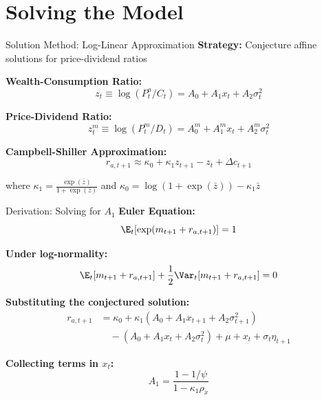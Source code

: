 \documentclass{beamer}
\begin{document}
\section{Solving the Model}

\begin{frame}{Solution Method: Log-Linear Approximation}
    \textbf{Strategy:} Conjecture affine solutions for price-dividend ratios
    
    \textbf{Wealth-Consumption Ratio:}
    \begin{equation}
        z_t \equiv \log(P_t^a / C_t) = A_0 + A_1 x_t + A_2 \sigma_t^2
    \end{equation}
    
    \textbf{Price-Dividend Ratio:}
    \begin{equation}
        z_t^m \equiv \log(P_t^m / D_t) = A_0^m + A_1^m x_t + A_2^m \sigma_t^2
    \end{equation}
    
    \vspace{0.3cm}
    \textbf{Campbell-Shiller Approximation:}
    \begin{equation}
        r_{a,t+1} \approx \kappa_0 + \kappa_1 z_{t+1} - z_t + \Delta c_{t+1}
    \end{equation}
    
    where $\kappa_1 = \frac{\exp(\bar{z})}{1+\exp(\bar{z})}$ and $\kappa_0 = \log(1+\exp(\bar{z})) - \kappa_1 \bar{z}$
\end{frame}

\begin{frame}{Derivation: Solving for $A_1$}
    \textbf{Euler Equation:}
    \begin{equation}
        \E_t[\exp(m_{t+1} + r_{a,t+1})] = 1
    \end{equation}
    
    \textbf{Under log-normality:}
    \begin{equation}
        \E_t[m_{t+1} + r_{a,t+1}] + \frac{1}{2} \Var_t[m_{t+1} + r_{a,t+1}] = 0
    \end{equation}
    
    \textbf{Substituting the conjectured solution:}
    \begin{align}
        r_{a,t+1} &= \kappa_0 + \kappa_1(A_0 + A_1 x_{t+1} + A_2 \sigma_{t+1}^2) \nonumber \\
        &\quad - (A_0 + A_1 x_t + A_2 \sigma_t^2) + \mu + x_t + \sigma_t \eta_{t+1}
    \end{align}
    
    \textbf{Collecting terms in $x_t$:}
    \begin{equation}
        A_1 = \frac{1 - 1/\psi}{1 - \kappa_1 \rho_x}
    \end{equation}
\end{frame}
\end{document}
